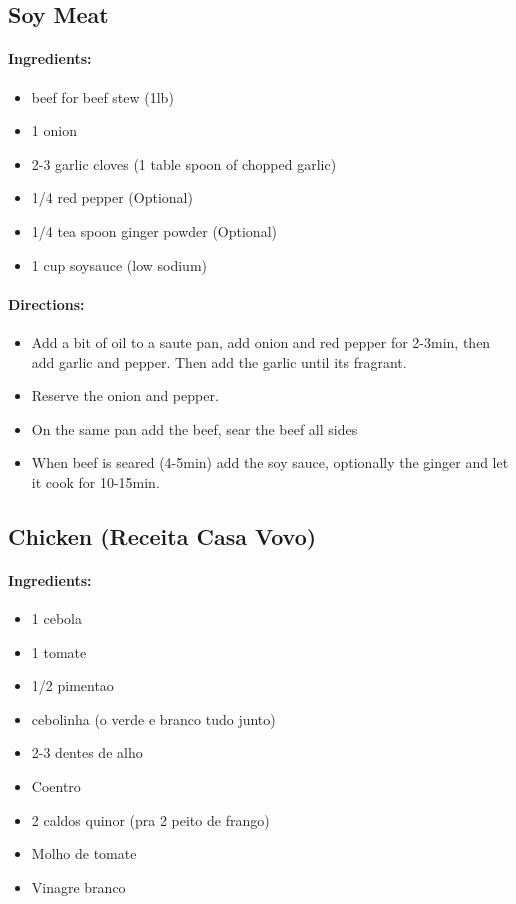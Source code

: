 \documentclass{article}
\begin{document}
\subsection{Soy Meat}

\paragraph{Ingredients:}

\begin{itemize}
	\item beef for beef stew (1lb)
	\item 1 onion
	\item 2-3 garlic cloves (1 table spoon of chopped garlic)
	\item 1/4 red pepper (Optional)
	\item 1/4 tea spoon ginger powder (Optional)
	\item 1 cup soysauce (low sodium)
\end{itemize}

\paragraph{Directions:}
\begin{itemize}
	\item Add a bit of oil to a saute pan, add onion and red pepper for 2-3min, then add garlic and pepper. Then add the garlic until its fragrant.
	\item Reserve the onion and pepper.
	\item On the same pan add the beef, sear the beef all sides
	\item When beef is seared (4-5min) add the soy sauce, optionally the ginger and let it cook for 10-15min.
\end{itemize}

\subsection{Chicken (Receita Casa Vovo)}

\paragraph{Ingredients:}

\begin{itemize}
	\item 1 cebola 
	\item 1 tomate 
	\item 1/2 pimentao 
	\item cebolinha (o verde e branco tudo junto) 
	\item 2-3 dentes de alho 
	\item Coentro 
	\item 2 caldos quinor (pra 2 peito de frango) 
	\item Molho de tomate 
	\item Vinagre branco
\end{itemize}
\end{document}
